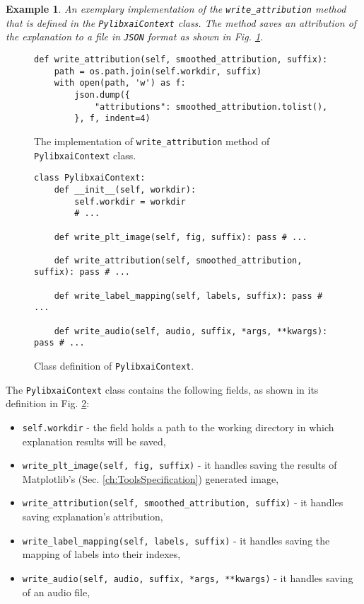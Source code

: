 \documentclass[
    bindingoffset=5mm,  %
    footnoteindent=3mm, %
    hyphenation=true    %
]{src/wut-thesis}
\newtheorem{example}{Example}
\begin{document}
\begin{example}
    An exemplary implementation of the \texttt{write\_attribution} method that is defined in the
    \texttt{PylibxaiContext} class. The method saves an attribution of the explanation to a file in \texttt{JSON} format
    as shown in Fig. \ref{fig:WriteAttributionMethod}.
\end{example}

\begin{figure}%
\begin{verbatim}
def write_attribution(self, smoothed_attribution, suffix):
    path = os.path.join(self.workdir, suffix)
    with open(path, 'w') as f:
        json.dump({
            "attributions": smoothed_attribution.tolist(),
        }, f, indent=4)
\end{verbatim}
\caption{The implementation of \texttt{write\_attribution} method of \texttt{PylibxaiContext} class.}
\label{fig:WriteAttributionMethod}
\end{figure}

\begin{figure}%
\begin{verbatim}
class PylibxaiContext:
    def __init__(self, workdir):
        self.workdir = workdir
        # ...
    
    def write_plt_image(self, fig, suffix): pass # ...
    
    def write_attribution(self, smoothed_attribution, suffix): pass # ...

    def write_label_mapping(self, labels, suffix): pass # ...
    
    def write_audio(self, audio, suffix, *args, **kwargs): pass # ...
\end{verbatim}
\caption{Class definition of \texttt{PylibxaiContext}.}
\label{fig:PylibxaiContext}
\end{figure}

The \texttt{PylibxaiContext} class contains the following fields, as shown in its definition in Fig. \ref{fig:PylibxaiContext}:

\begin{itemize}
    \item \texttt{self.workdir} - the field holds a path to the working directory in which explanation results will be saved,
    \item \texttt{write_plt_image(self, fig, suffix)} - it handles saving the results of Matplotlib's (Sec. \ref{ch:ToolsSpecification}) generated image,
    \item \texttt{write_attribution(self, smoothed_attribution, suffix)} - it handles saving explanation's attribution,
    \item \texttt{write_label_mapping(self, labels, suffix)} - it handles saving the mapping of labels into their indexes,
    \item \texttt{write_audio(self, audio, suffix, *args, **kwargs)} - it handles saving of an audio file,
\end{itemize}
\end{document}
